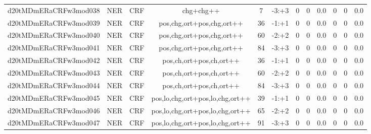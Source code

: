 \documentclass[a4paper]{article}
\begin{document}
\begin{landscape}
\begin{center}
\begin{tabular}{ |c|c|c|c|c|c|c|c|c|c|c|c|}
 
 	
 	\small{ d20tMDmERaCRFw3mod038 } & \small{ NER} & \small{  CRF }  & chg+chg++  &  7 &  \small{  -3:+3 }  &  0 & 0 & 0.0  &  0 & 0 & 0.0 \\
 	

 
 	
 	\small{ d20tMDmERaCRFw3mod039 } & \small{ NER} & \small{  CRF }  & pos,chg,ort+pos,chg,ort++  &  36 &  \small{  -1:+1 }  &  0 & 0 & 0.0  &  0 & 0 & 0.0 \\
 	

 
 	
 	\small{ d20tMDmERaCRFw3mod040 } & \small{ NER} & \small{  CRF }  & pos,chg,ort+pos,chg,ort++  &  60 &  \small{  -2:+2 }  &  0 & 0 & 0.0  &  0 & 0 & 0.0 \\
 	

 
 	
 	\small{ d20tMDmERaCRFw3mod041 } & \small{ NER} & \small{  CRF }  & pos,chg,ort+pos,chg,ort++  &  84 &  \small{  -3:+3 }  &  0 & 0 & 0.0  &  0 & 0 & 0.0 \\
 	

 
 	
 	\small{ d20tMDmERaCRFw3mod042 } & \small{ NER} & \small{  CRF }  & pos,ch,ort+pos,ch,ort++  &  36 &  \small{  -1:+1 }  &  0 & 0 & 0.0  &  0 & 0 & 0.0 \\
 	

 
 	
 	\small{ d20tMDmERaCRFw3mod043 } & \small{ NER} & \small{  CRF }  & pos,ch,ort+pos,ch,ort++  &  60 &  \small{  -2:+2 }  &  0 & 0 & 0.0  &  0 & 0 & 0.0 \\
 	

 
 	
 	\small{ d20tMDmERaCRFw3mod044 } & \small{ NER} & \small{  CRF }  & pos,ch,ort+pos,ch,ort++  &  84 &  \small{  -3:+3 }  &  0 & 0 & 0.0  &  0 & 0 & 0.0 \\
 	

 
 	
 	\small{ d20tMDmERaCRFw3mod045 } & \small{ NER} & \small{  CRF }  & pos,lo,chg,ort+pos,lo,chg,ort++  &  39 &  \small{  -1:+1 }  &  0 & 0 & 0.0  &  0 & 0 & 0.0 \\
 	

 
 	
 	\small{ d20tMDmERaCRFw3mod046 } & \small{ NER} & \small{  CRF }  & pos,lo,chg,ort+pos,lo,chg,ort++  &  65 &  \small{  -2:+2 }  &  0 & 0 & 0.0  &  0 & 0 & 0.0 \\
 	

 
 	
 	\small{ d20tMDmERaCRFw3mod047 } & \small{ NER} & \small{  CRF }  & pos,lo,chg,ort+pos,lo,chg,ort++  &  91 &  \small{  -3:+3 }  &  0 & 0 & 0.0  &  0 & 0 & 0.0 \\
 	


\end{tabular}
\end{center}
\end{landscape}
\end{document}
